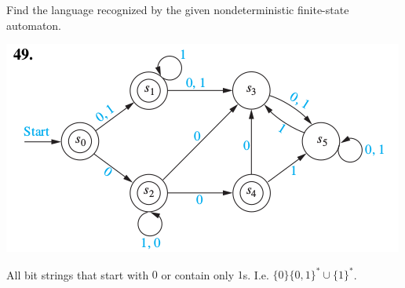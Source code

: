 \documentclass[../main.tex]{subfiles}
\begin{document}
Find the language recognized by the given nondeterministic finite-state automaton.

\includegraphics[width=\textwidth]{img/Q13_3_49}
\solution

All bit strings that start with $0$ or contain only $1$s. I.e. $\{0\}\{0,1\}^\ast \cup \{1\}^\ast$. 
\end{document}
